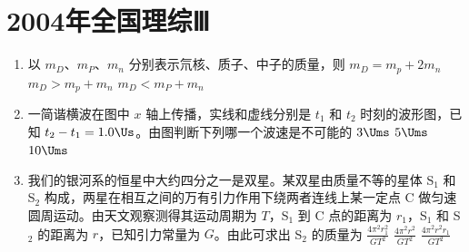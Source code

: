 \documentclass[\gkver]{gaokaozhenti}
\begin{document}
\chapter{2004年全国理综Ⅲ}

\begin{enumerate}
\item
以 $m_{D}$、$m_{P}$、$m_{n}$ 分别表示氘核、质子、中子的质量，则
{$m_{D}=m_{p}+2m_{n}$}
{$m_{D}>m_{p}+m_{n}$}
{$m_{D}<m_{P}+m_{n}$}

\item
一简谐横波在图中 $x$ 轴上传播，实线和虚线分别是 $t_{1}$ 和 $t_{2}$ 时刻的波形图，已知 $t_{2}-t_{1}=1.0\Us$。由图判断下列哪一个波速是不可能的
\fourchoices[answer=D]
{$1\Ums$}
{$3\Ums$}
{$5\Ums$}
{$10\Ums$}

\item
我们的银河系的恒星中大约四分之一是双星。某双星由质量不等的星体 S$_{1}$ 和 S$_{2}$ 构成，两星在相互之间的万有引力作用下绕两者连线上某一定点 C 做匀速圆周运动。由天文观察测得其运动周期为 $T$，S$_{1}$ 到 C 点的距离为 $r_{1}$，S$_{1}$ 和 S$_{2}$ 的距离为 $r$，已知引力常量为 $G$。由此可求出 S$_{2}$ 的质量为
{$\frac{4\pi^{2}r_{1}^{2}}{GT^{2}}$}
{$\frac{4\pi^{2}r^{2}}{GT^{2}}$}
{$\frac{4\pi^{2}r^{2}r_{1}}{GT^{2}}$}


\end{enumerate}
\end{document}
